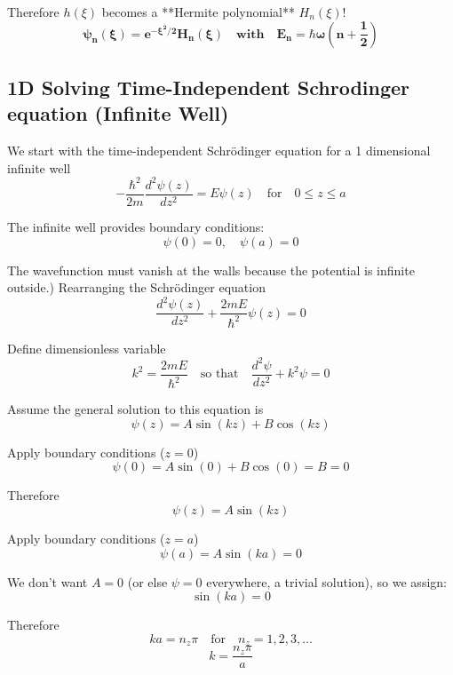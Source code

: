 \documentclass[12pt]{article}
\begin{document}
        Therefore \( h(\xi) \) becomes a **Hermite polynomial** \( H_n(\xi) \)!
        \[
        \boldsymbol{\boxed{\psi_n(\xi) = e^{-\xi^2/2} H_n(\xi)\quad 
        \text{with} \quad
        E_n = \hbar\omega\left( n + \frac{1}{2} \right)}}
        \]

    \subsection{1D Solving Time-Independent Schrodinger equation (Infinite Well)} \label{sec: 1DTISE}
        We start with the time-independent Schrödinger equation for a 1 dimensional infinite well
        \[
            -\frac{\hbar^2}{2m} \frac{d^2 \psi(z)}{dz^2} = E \psi(z) \quad \text{for} \quad 0 \leq z \leq a
        \]

        The infinite well provides boundary conditions:
        \[
            \psi(0) = 0, \quad \psi(a) = 0
        \]
 
        The wavefunction must vanish at the walls because the potential is infinite outside.)
        \newline 
        Rearranging the Schrödinger equation
        \[
            \frac{d^2 \psi(z)}{dz^2} + \frac{2mE}{\hbar^2} \psi(z) = 0
        \]

        Define dimensionless variable
        \begin{equation} \label{eq: k}
            k^2 = \frac{2mE}{\hbar^2}
            \quad \text{so that} \quad
            \frac{d^2 \psi}{dz^2} + k^2 \psi = 0
        \end{equation}

        Assume the general solution to this equation is
        \[
            \psi(z) = A \sin(kz) + B \cos(kz)
        \]
        
        Apply boundary conditions ($z=0$)
        \[
            \psi(0) = A \sin(0) + B \cos(0) = B = 0
        \]

        Therefore
        \[
            \psi(z) = A \sin(kz)
        \]

        Apply boundary conditions ($z=a$)
        \[
            \psi(a) = A \sin(ka) = 0
        \]

        We don't want \( A=0 \) (or else \(\psi=0\) everywhere, a trivial solution), so we assign:
        \[
            \sin(ka) = 0
        \]

        Therefore
        \[
            ka = n_z \pi \quad \text{for} \quad n_z = 1, 2, 3, \dots
        \]
        \[
            k = \frac{n_z \pi}{a}
        \]
\end{document}

